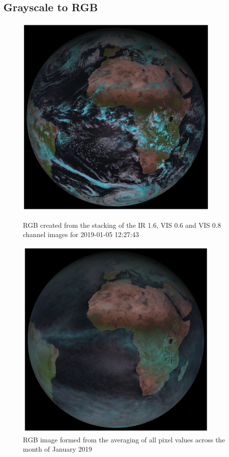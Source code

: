 \subsection{Grayscale to RGB}
\begin{figure}[!hbt]
    \centering
    \begin{minipage}{0.45\textwidth}
        \centering
        \includegraphics[width=0.9\textwidth]{2019-01-05 122743.pdf}
        \caption{RGB created from the stacking of the IR 1.6, VIS 0.6 and VIS 0.8 channel images for 2019-01-05 12:27:43 }
        \label{fig:av_rgb}
    \end{minipage}\hfill
        \begin{minipage}{0.45\textwidth}
        \centering
        \includegraphics[width=0.9\textwidth]{2019-01-05 122743_av.pdf}
        \caption{RGB image formed from the averaging of all pixel values across the month of January 2019}
        \label{fig:av_cloud}
    \end{minipage}\hfill
\end{figure}

